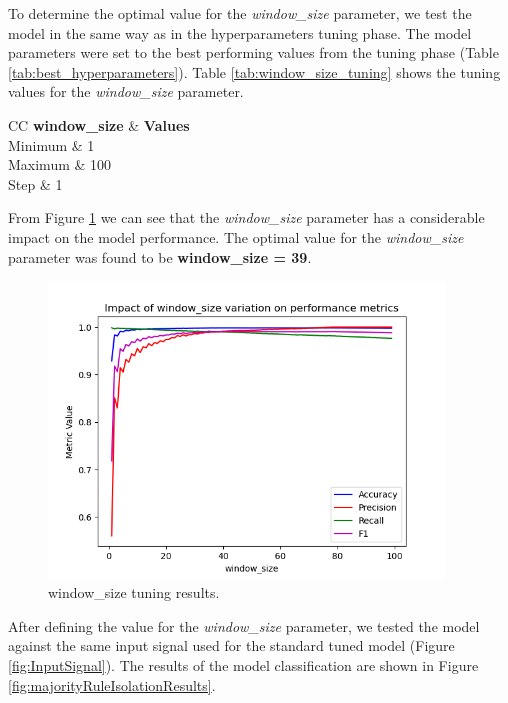 \documentclass[futureinternet,article,submit,pdftex,moreauthors]{Definitions/mdpi}
\begin{document}
To determine the optimal value for the \textit{window\_size} parameter, we test the model in the same way as in the hyperparameters tuning phase. The model parameters were set to the best performing values from the tuning phase (Table \ref{tab:best_hyperparameters}). Table \ref{tab:window_size_tuning} shows the tuning values for the \textit{window\_size} parameter.

\begin{table}[H]
	\centering
	\caption{window\_size tuning values.}\label{tab:window_size_tuning}
	\begin{tabularx}{\textwidth}{CC}
	\toprule
	\textbf{window\_size} & \textbf{Values} \\
	\midrule
	Minimum & 1 \\
	Maximum & 100 \\
	Step & 1 \\
	\bottomrule
\end{tabularx}
\end{table}

From Figure \ref{fig:window_size_tuning} we can see that the \textit{window\_size} parameter has a considerable impact on the model performance. The optimal value for the \textit{window\_size} parameter was found to be \textbf{window\_size = 39}.

\begin{figure}[H]
	\includegraphics[width=10.5cm]{img/WindowSizeTuning.png}
	\caption{window\_size tuning results.}\label{fig:window_size_tuning}
\end{figure}

After defining the value for the \textit{window\_size} parameter, we tested the model against the same input signal used for the standard tuned model (Figure \ref{fig:InputSignal}). The results of the model classification are shown in Figure \ref{fig:majorityRuleIsolationResults}. 
\end{document}
